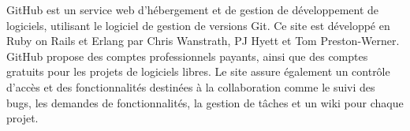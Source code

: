 \begin{minipage}{0.2\textwidth}
	\begin{minipage}{\linewidth}
			\label{f3}%
	\end{minipage}
\end{minipage}
\hfill
\begin{minipage}{0.75\textwidth}
GitHub est un service web d'hébergement et de gestion de développement de logiciels, utilisant le logiciel de gestion de versions Git. Ce site est développé en Ruby on Rails et Erlang par Chris Wanstrath, PJ Hyett et Tom Preston-Werner. GitHub propose des comptes professionnels payants, ainsi que des comptes gratuits pour les projets de logiciels libres. Le site assure également un contrôle d'accès et des fonctionnalités destinées à la collaboration comme le suivi des bugs, les demandes de fonctionnalités, la gestion de tâches et un wiki pour chaque projet.\\
\end{minipage}\\

